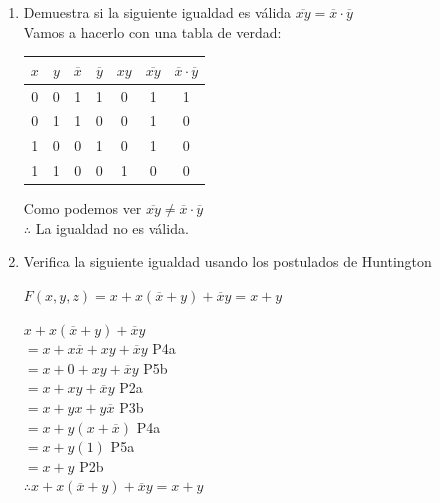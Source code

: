\documentclass[a4paper,12pt]{article}
\begin{document}
\begin{enumerate}[label=\textcolor{teal}{\textbf{\arabic*.}}]
    \item  Demuestra si la siguiente igualdad es válida $\overline{xy}=\overline{x} \cdot \overline{y}$\\
    Vamos a hacerlo con una tabla de verdad:\\
    \begin{table}[H]
    \centering
        \begin{tabular}{|c|c|c|c|c|c|c|} 
            \hline
            $x$ & $y$ & $\overline{x}$ & $\overline{y}$ & $xy$ & $\overline{xy}$ & $\overline{x} \cdot \overline{y}$ \\ \hline
            0 & 0 & 1 & 1 & 0 & 1 & 1 \\ \hline
            0 & 1 & 1 & 0 & 0 & 1 & 0 \\ \hline
            1 & 0 & 0 & 1 & 0 & 1 & 0 \\ \hline
            1 & 1 & 0 & 0 & 1 & 0 & 0 \\ \hline
        \end{tabular}
    \end{table}
    Como podemos ver $\overline{xy} \neq \overline{x} \cdot \overline{y}$\\
    $\therefore$ La igualdad no es válida.  
        
        

    \item Verifica la siguiente igualdad usando los postulados de Huntington
            \begin{center}
                $F(x,y,z) = x + x(\overline{x} + y) + \overline{x} y = x + y$
            \end{center}

            $x + x(\overline{x} + y) + \overline{x} y$\\
            $= x + x\overline{x} + xy + \overline{x} y$ P4a\\
            $= x + 0 + xy + \overline{x} y$ P5b\\
            $= x + xy + \overline{x} y$ P2a\\
            $= x + yx + y\overline{x} $ P3b\\
            $= x + y(x + \overline{x}) $ P4a\\
            $= x + y(1) $ P5a\\
            $= x + y $ P2b\\

            $ \therefore x + x(\overline{x} + y) + \overline{x} y = x + y$\\
           

\end{enumerate}
\end{document}
